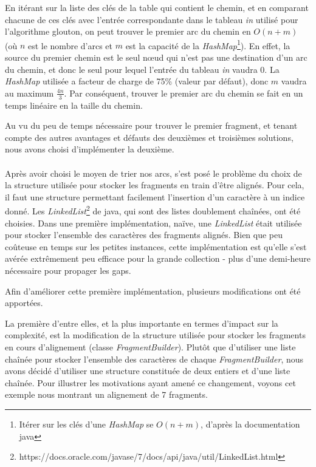\documentclass{article}
\begin{document}
En itérant sur la liste des clés de la table qui contient le chemin, et en comparant chacune de ces clés avec l'entrée correspondante dans le tableau \textit{in} utilisé pour l'algorithme glouton, on peut trouver le premier arc du chemin en $O(n+m)$ (où $n$ est le nombre d'arcs et $m$ est la capacité de la \textit{HashMap}\footnote{Itérer sur les clés d'une \textit{HashMap} se $O(n+m)$, d'après la documentation java}). En effet, la source du premier chemin est le seul nœud qui n'est pas une destination d'un arc du chemin, et donc le seul pour lequel l'entrée du tableau \textit{in} vaudra $0$. La \textit{HashMap} utilisée a facteur de charge de 75\% (valeur par défaut), donc $m$ vaudra au maximum $\frac{4n}{3}$. Par conséquent, trouver le premier arc du chemin se fait en un temps linéaire en la taille du chemin.

Au vu du peu de temps nécessaire pour trouver le premier fragment, et tenant compte des autres avantages et défauts des deuxièmes et troisièmes solutions, nous avons choisi d'implémenter la deuxième.
\\~\\ 
 
Après avoir choisi le moyen de trier nos arcs, s'est posé le problème du choix de la structure utilisée pour stocker les fragments en train d'être alignés. Pour cela, il faut une structure permettant facilement l'insertion d'un caractère à un indice donné. Les \textit{LinkedList}\footnote{https://docs.oracle.com/javase/7/docs/api/java/util/LinkedList.html} de java, qui sont des listes doublement chaînées, ont été choisies. Dans une première implémentation, naïve, une \textit{LinkedList} était utilisée pour stocker l'ensemble des caractères des fragments alignés. 
Bien que peu coûteuse en temps sur les petites instances, cette implémentation est qu'elle s'est avérée extrêmement peu efficace pour la grande collection - plus d'une demi-heure nécessaire pour propager les gaps. 

Afin d'améliorer cette première implémentation, plusieurs modifications ont été apportées.

La première d'entre elles, et la plus importante en termes d'impact sur la complexité, est la modification de la structure utilisée pour stocker les fragments en cours d'alignement (classe \textit{FragmentBuilder}). Plutôt que d'utiliser une liste chaînée pour stocker l'ensemble des caractères de chaque \textit{FragmentBuilder}, nous avons décidé d'utiliser une structure constituée de deux entiers et d'une liste chaînée. Pour illustrer les motivations ayant amené ce changement, voyons cet exemple nous montrant un alignement de 7 fragments.
\end{document}
